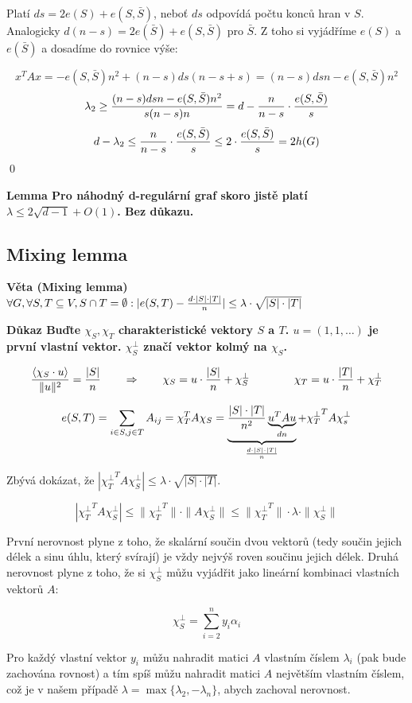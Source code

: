 \documentclass[a4paper,12pt,titlepage]{article}
\newcommand{\lm}{\smallskip\noindent\bf Lemma\rm{} }
\newcommand{\dk}{\smallskip\noindent\bf Důkaz\rm{} }
\newcommand{\vt}{\smallskip\noindent\bf Věta\rm{} }
\newcommand{\xttt}{{\chi_T^\bot}^T}
\newcommand{\sk}[1]{\langle #1\rangle}
\begin{document}
Platí $ds = 2e(S) + e(S,\bar S)$, neboť $ds$ odpovídá počtu konců hran v $S$. Analogicky $d(n-s) = 2e(\bar S) + e(S,\bar S)$ pro $\bar S$. Z toho si vyjádříme $e(S)$ a $e(\bar S)$ a dosadíme do rovnice výše:

$$x^TAx = -e(S,\bar S)n^2 + (n-s)ds(n-s+s) = (n-s)dsn - e(S,\bar S)n^2$$
$$\lambda_2 \ge {(n-s)dsn - e(S,\bar S)n^2 \over s(n-s)n} = d - {n\over n-s}\cdot{e(S,\bar S)\over s}$$
$$d-\lambda_2 \le {n\over n-s} \cdot {e(S,\bar S)\over s} \le 2\cdot{e(S,\bar S)\over s} = 2h(G)$$
\qed

\lm Pro náhodný d-regulární graf skoro jistě platí $\lambda \le 2\sqrt{d-1} + O(1)$. Bez důkazu.

\subsection{Mixing lemma}
\vt (Mixing lemma) $\forall G, \forall S,T \subseteq V, S\cap T = \emptyset: |e(S,T) - {d\cdot|S|\cdot|T|\over n}| \le \lambda\cdot\sqrt{|S|\cdot|T|}$

\dk Buďte $\chi_S, \chi_T$ charakteristické vektory $S$ a $T$. $u = (1,1,\dots)$ je první vlastní vektor. $\chi_S^\bot$ značí vektor kolmý na $\chi_S$.

$${\sk{\chi_S \cdot u} \over \|u\|^2} = {|S|\over n} \qquad\Rightarrow\qquad \chi_S = u\cdot {|S|\over n} + \chi_S^\bot \qquad\qquad \chi_T = u\cdot {|T|\over n} + \chi_T^\bot$$

$$e(S,T) = \sum_{i\in S, j\in T} A_{ij} = \chi_T^TA\chi_S = \underbrace{{|S|\cdot |T| \over n^2} \underbrace{u^TAu}_{dn}}_{d\cdot |S|\cdot |T|\over n} + \xttt A\chi_s^\bot$$

Zbývá dokázat, že $|\xttt A\chi_S^\bot| \le \lambda\cdot\sqrt{|S|\cdot |T|}$.

$$|\xttt A\chi_S^\bot| \le \|\xttt \| \cdot \|A\chi_S^\bot\| \le \|\xttt\|\cdot\lambda\cdot\|\chi_S^\bot\|$$

První nerovnost plyne z toho, že skalární součin dvou vektorů (tedy součin
jejich délek a sinu úhlu, který svírají) je vždy nejvýš roven součinu jejich
délek. Druhá nerovnost plyne z toho, že si $\chi_S^\bot$ můžu vyjádřit jako
lineární kombinaci vlastních vektorů $A$:

$$\chi_S^\bot = \sum_{i=2}^n y_i\alpha_i$$

Pro každý vlastní vektor $y_i$ můžu nahradit matici $A$ vlastním číslem
$\lambda_i$ (pak bude zachována rovnost) a tím spíš můžu nahradit matici $A$
největším vlastním číslem, což je v našem případě $\lambda =
\max\{\lambda_2,-\lambda_n\}$, abych zachoval nerovnost.
\end{document}
